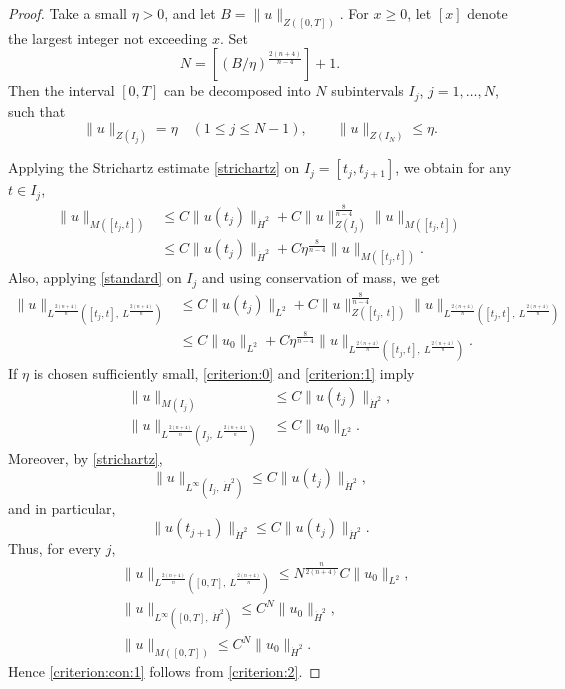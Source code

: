 \documentclass[10pt,a4paper]{amsart}
\begin{document}
\begin{proof}
Take a small $\eta > 0$, and let $B = \|u\|_{Z([0, T])}$. For $x \geq 0$, let $[x]$ denote the largest integer not exceeding $x$.
Set
\[
N = \left[ (B/\eta)^{\frac{2(n+4)}{n-4}} \right] + 1.
\]
Then the interval $[0, T]$ can be decomposed into $N$ subintervals $I_{j}$, $j=1,\dots,N$, such that
\[
\|u\|_{Z(I_{j})} = \eta \quad (1 \leq j \leq N - 1), \qquad \|u\|_{Z(I_{N})} \leq \eta.
\]

Applying the Strichartz estimate \eqref{strichartz} on $I_{j} = [t_{j}, t_{j+1}]$, we obtain for any $t \in I_{j}$,
\begin{equation}\label{criterion:0}
\begin{aligned}
\|u\|_{M([t_{j}, t])}
&\leq C\|u(t_{j})\|_{\dot{H}^{2}} + C\|u\|_{Z(I_{j})}^{\frac{8}{n-4}}\|u\|_{M([t_{j}, t])} \\
&\leq C\|u(t_{j})\|_{\dot{H}^{2}} + C\eta^{\frac{8}{n-4}}\|u\|_{M([t_{j}, t])}.
\end{aligned}
\end{equation}
Also, applying \eqref{standard} on $I_{j}$ and using conservation of mass, we get
\begin{equation}\label{criterion:1}
\begin{aligned}
\|u\|_{L^{\frac{2(n+4)}{n}}([t_{j}, t], \ L^{\frac{2(n+4)}{n}})}
&\leq C\|u(t_{j})\|_{L^{2}} + C\|u\|_{Z([t_{j},\ t])}^{\frac{8}{n-4}}\|u\|_{L^{\frac{2(n+4)}{n}}([t_{j}, t], \ L^{\frac{2(n+4)}{n}})} \\
&\leq C\|u_{0}\|_{L^{2}} + C\eta^{\frac{8}{n-4}}\|u\|_{L^{\frac{2(n+4)}{n}}([t_{j}, t], \ L^{\frac{2(n+4)}{n}})}.
\end{aligned}
\end{equation}
If $\eta$ is chosen sufficiently small, \eqref{criterion:0} and \eqref{criterion:1} imply
\begin{align*}
\|u\|_{M(I_{j})} &\leq C\|u(t_{j})\|_{\dot{H}^{2}}, \\
\|u\|_{L^{\frac{2(n+4)}{n}}(I_{j}, \ L^{\frac{2(n+4)}{n}})} &\leq C\|u_{0}\|_{L^{2}}.
\end{align*}
Moreover, by \eqref{strichartz},
\[
\|u\|_{L^{\infty}(I_{j},\ \dot{H}^{2})} \leq C\|u(t_{j})\|_{\dot{H}^{2}},
\]
and in particular,
\[
\|u(t_{j+1})\|_{\dot{H}^{2}} \leq C\|u(t_{j})\|_{\dot{H}^{2}}.
\]
Thus, for every $j$,
\begin{equation}\label{criterion:2}
\begin{aligned}
&\|u\|_{L^{\frac{2(n+4)}{n}}([0, T], \ L^{\frac{2(n+4)}{n}})} \leq N^{\frac{n}{2(n+4)}}C\|u_{0}\|_{L^{2}}, \\
&\|u\|_{L^{\infty}([0,T],\ \dot{H}^{2})} \leq C^{N}\|u_{0}\|_{\dot{H}^{2}}, \\
&\|u\|_{M([0,T])} \leq C^{N}\|u_{0}\|_{\dot{H}^{2}}.
\end{aligned}
\end{equation}
Hence \eqref{criterion:con:1} follows from \eqref{criterion:2}.


\end{proof}
\end{document}

